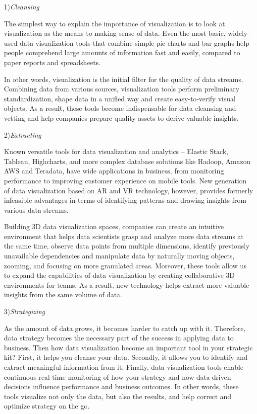 \documentclass[]{book}
\theoremstyle{definition}
\theoremstyle{definition}
\theoremstyle{definition}
\theoremstyle{remark}
\begin{document}
1)\emph{Cleansing}

The simplest way to explain the importance of visualization is to look
at visualization as the means to making sense of data. Even the most
basic, widely-used data visualization tools that combine simple pie
charts and bar graphs help people comprehend large amounts of
information fast and easily, compared to paper reports and spreadsheets.

In other words, visualization is the initial filter for the quality of
data streams. Combining data from various sources, visualization tools
perform preliminary standardization, shape data in a unified way and
create easy-to-verify visual objects. As a result, these tools become
indispensable for data cleansing and vetting and help companies prepare
quality assets to derive valuable insights.

2)\emph{Extracting}

Known versatile tools for data visualization and analytics -- Elastic
Stack, Tableau, Highcharts, and more complex database solutions like
Hadoop, Amazon AWS and Teradata, have wide applications in business,
from monitoring performance to improving customer experience on mobile
tools. New generation of data visualization based on AR and VR
technology, however, provides formerly infeasible advantages in terms of
identifying patterns and drawing insights from various data streams.

Building 3D data visualization spaces, companies can create an intuitive
environment that helps data scientists grasp and analyze more data
streams at the same time, observe data points from multiple dimensions,
identify previously unavailable dependencies and manipulate data by
naturally moving objects, zooming, and focusing on more granulated
areas. Moreover, these tools allow us to expand the capabilities of data
visualization by creating collaborative 3D environments for teams. As a
result, new technology helps extract more valuable insights from the
same volume of data.

3)\emph{Strategizing}

As the amount of data grows, it becomes harder to catch up with it.
Therefore, data strategy becomes the necessary part of the success in
applying data to business. Then how data visualization become an
important tool in your strategic kit? First, it helps you cleanse your
data. Secondly, it allows you to identify and extract meaningful
information from it. Finally, data visualization tools enable continuous
real-time monitoring of how your strategy and now data-driven decisions
influence performance and business outcomes. In other words, these tools
visualize not only the data, but also the results, and help correct and
optimize strategy on the go.
\end{document}
